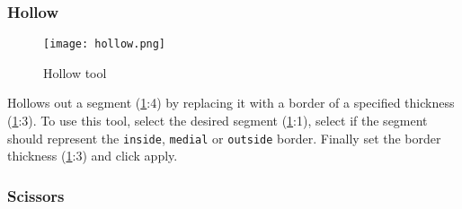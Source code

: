 \pagebreak
\subsubsection{Hollow}
\begin{figure}[h]
	\begin{subfigure}{0.2\textwidth}
		
	\end{subfigure}
\end{figure}

\begin{figure}[h!]
	\centerline{
		\texttt{[image: hollow.png]}}
	\caption{Hollow tool}\label{fig:hollow}
\end{figure}
\noindent
Hollows out a segment (\cref{fig:hollow}:4) by replacing it with a border of a specified thickness (\cref{fig:hollow}:3).
To use this tool, select the desired segment (\cref{fig:hollow}:1), select if the segment should represent the \texttt{inside}, \texttt{medial} or \texttt{outside} border.
Finally set the border thickness (\cref{fig:hollow}:3) and click apply.

\pagebreak
\subsubsection{Scissors}\label{section:scissors}
\begin{figure}[h]
	\begin{subfigure}{0.2\textwidth}
		
	\end{subfigure}
	\begin{subfigure}{0.2\textwidth}
		
	\end{subfigure}
\end{figure}



